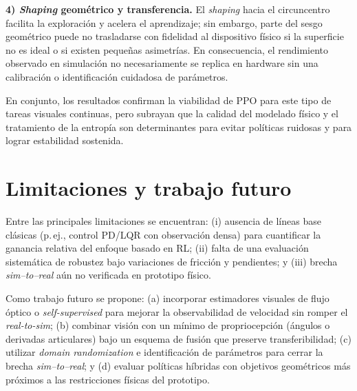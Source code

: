 \documentclass[conference]{IEEEtran}
\begin{document}
\textbf{4) \emph{Shaping} geométrico y transferencia.}
El \emph{shaping} hacia el circuncentro facilita la exploración y acelera el aprendizaje; sin embargo, parte del sesgo geométrico puede no trasladarse con fidelidad al dispositivo físico si la superficie no es ideal o si existen pequeñas asimetrías. En consecuencia, el rendimiento observado en simulación no necesariamente se replica en hardware sin una calibración o identificación cuidadosa de parámetros.

En conjunto, los resultados confirman la viabilidad de PPO para este tipo de tareas visuales continuas, pero subrayan que la calidad del modelado físico y el tratamiento de la entropía son determinantes para evitar políticas ruidosas y para lograr estabilidad sostenida.

\section{Limitaciones y trabajo futuro}
Entre las principales limitaciones se encuentran: (i) ausencia de líneas base clásicas (p.\,ej., control PD/LQR con observación densa) para cuantificar la ganancia relativa del enfoque basado en RL; (ii) falta de una evaluación sistemática de robustez bajo variaciones de fricción y pendientes; y (iii) brecha \emph{sim--to--real} aún no verificada en prototipo físico.

Como trabajo futuro se propone: (a) incorporar estimadores visuales de flujo óptico o \emph{self-supervised} para mejorar la observabilidad de velocidad sin romper el \emph{real-to-sim}; (b) combinar visión con un mínimo de propriocepción (ángulos o derivadas articulares) bajo un esquema de fusión que preserve transferibilidad; (c) utilizar \emph{domain randomization} e identificación de parámetros para cerrar la brecha \emph{sim--to--real}; y (d) evaluar políticas híbridas con objetivos geométricos más próximos a las restricciones físicas del prototipo.
\end{document}
